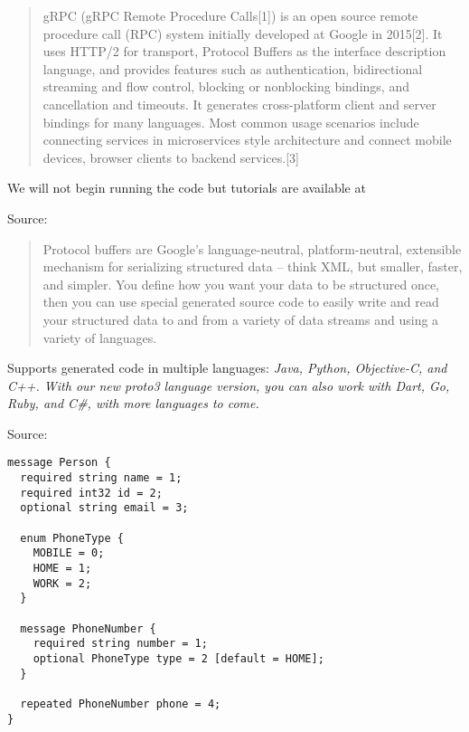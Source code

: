 \documentclass[Screen16to9,17pt]{foils}
\begin{document}

\begin{quote}
gRPC (gRPC Remote Procedure Calls[1]) is an open source remote procedure call (RPC) system initially developed at Google in 2015[2]. It uses HTTP/2 for transport, Protocol Buffers as the interface description language, and provides features such as authentication, bidirectional streaming and flow control, blocking or nonblocking bindings, and cancellation and timeouts. It generates cross-platform client and server bindings for many languages. Most common usage scenarios include connecting services in microservices style architecture and connect mobile devices, browser clients to backend services.[3]
\end{quote}

\begin{list2}
\item We will not begin running the code but tutorials are available at  
\end{list2}
Source: {\footnotesize\\
 }


\begin{quote}
Protocol buffers are Google's language-neutral, platform-neutral, extensible mechanism for serializing structured data – think XML, but smaller, faster, and simpler. You define how you want your data to be structured once, then you can use special generated source code to easily write and read your structured data to and from a variety of data streams and using a variety of languages.
\end{quote}


\begin{list2}
\item Supports generated code in multiple languages:
\emph{Java, Python, Objective-C, and C++. With our new proto3 language version, you can also work with Dart, Go, Ruby, and C\#, with more languages to come.}
\end{list2}
Source: {\footnotesize\\
}


\begin{verbatim}
message Person {
  required string name = 1;
  required int32 id = 2;
  optional string email = 3;

  enum PhoneType {
    MOBILE = 0;
    HOME = 1;
    WORK = 2;
  }

  message PhoneNumber {
    required string number = 1;
    optional PhoneType type = 2 [default = HOME];
  }

  repeated PhoneNumber phone = 4;
}
\end{verbatim}
\end{document}
